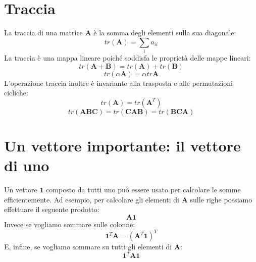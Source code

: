 \documentclass{article}
\begin{document}
    \section{Traccia}
        La traccia di una matrice $\mathbf{A}$ è la somma degli elementi sulla sua diagonale:
            \[tr(\mathbf{A}) = \sum_i a_{ii} \]
        La traccia è una mappa lineare poiché soddisfa le proprietà delle mappe lineari:
            \[tr(\mathbf{A} + \mathbf{B}) = tr(\mathbf{A}) + tr(\mathbf{B})\]
            \[tr(\alpha\mathbf{A}) = \alpha tr\mathbf{A} \]
        L'operazione traccia inoltre è invariante alla trasposta e alle permutazioni cicliche:
            \[tr(\mathbf{A}) = tr(\mathbf{A}^T)\]
            \[tr(\mathbf{ABC}) = tr(\mathbf{CAB}) = tr(\mathbf{BCA})\]

    \section{Un vettore importante: il vettore di uno}
        Un vettore $\mathbf{1}$ composto da tutti uno può essere usato per calcolare le somme efficientemente. Ad esempio, 
        per calcolare gli elementi di $\mathbf{A}$ sulle righe possiamo effettuare il seguente prodotto:
                    \[\mathbf{A1}\]
        Invece se vogliamo sommare sulle colonne:
                    \[\mathbf{1}^T\mathbf{A} = (\mathbf{A}^T\mathbf{1})^T\]
        E, infine, se vogliamo sommare su tutti gli elementi di $\mathbf{A}$:
                    \[\mathbf{1}^T\mathbf{A1}\]
                
\end{document}
